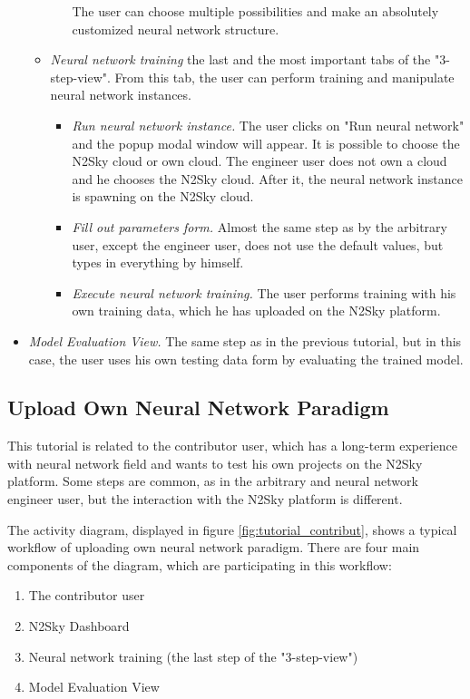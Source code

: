 \begin{itemize}
\begin{itemize}
\begin{itemize}
The user can choose multiple possibilities and make an absolutely customized neural network structure.

\end{itemize}
\item \emph{Neural network training} the last and the most important tabs of the "3-step-view". From this tab, the user can perform training and manipulate neural network instances.
\begin{itemize}
\item \emph{Run neural network instance.} The user clicks on "Run neural network" and the popup modal window will appear. It is possible to choose the N2Sky cloud or own cloud. The engineer user does not own a cloud and he chooses the N2Sky cloud. After it, the neural network instance is spawning on the N2Sky cloud.
\item \emph{Fill out parameters form.} Almost the same step as by the arbitrary user, except the engineer user, does not use the default values, but types in everything by himself.
\item \emph{Execute neural network training.} The user performs training with his own training data, which he has uploaded on the N2Sky platform.
\end{itemize}
\end{itemize}
 \item \emph{Model Evaluation View.} The same step as in the previous tutorial, but in this case, the user uses his own testing data form by evaluating the trained model.
\end{itemize}



\subsection{Upload Own Neural Network Paradigm}\label{Upload own neural network paradigm}

This tutorial is related to the contributor user, which has a long-term experience with neural network field and wants to test his own projects on the N2Sky platform.
Some steps are common, as in the arbitrary and neural network engineer user, but the interaction with the N2Sky platform is different.


The activity diagram, displayed in figure \ref{fig:tutorial_contribut}, shows a typical workflow of uploading own neural network paradigm. There are four main components of the diagram, which are participating in this workflow: 
\begin{enumerate}
\item The contributor user
\item N2Sky Dashboard
\item Neural network training (the last step of the "3-step-view")
\item Model Evaluation View
\end{enumerate}

